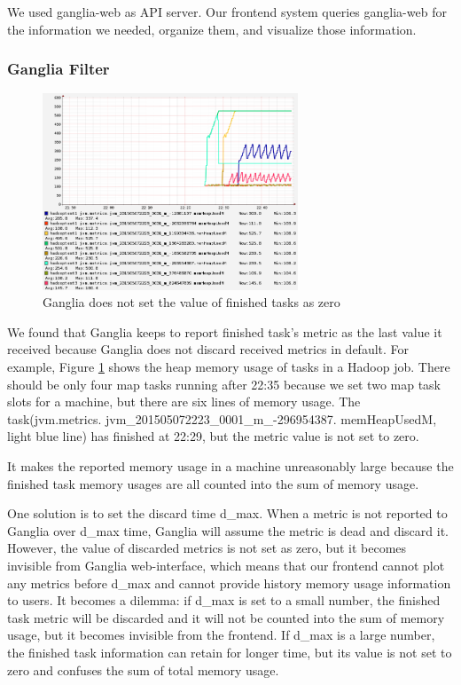 We used ganglia-web as API server. Our frontend system queries ganglia-web for the information we needed, organize them, and visualize those information. 

\subsubsection{Ganglia Filter}

\begin{figure}[ht]
  \centering
    \includegraphics[width=3.0in]{image/ganglia_finished_tasks.png}
    \caption{Ganglia does not set the value of finished tasks as zero}
    \label{ref:gangliah_bug}
\end{figure}

We found that Ganglia keeps to report finished task's metric as the last value it received because Ganglia does not discard received metrics in default. For example, Figure \ref{ref:gangliah_bug} shows the heap memory usage of tasks in a Hadoop job. There should be only four map tasks running after 22:35 because we set two map task slots for a machine, but there are six lines of memory usage. The task(jvm.metrics. jvm\_201505072223\_0001\_m\_-296954387. memHeapUsedM, light blue line) has finished at 22:29, but the metric value is not set to zero.

It makes the reported memory usage in a machine unreasonably large because the finished task memory usages are all counted into the sum of memory usage.

One solution is to set the discard time d\_max. When a metric is not reported to Ganglia over d\_max time, Ganglia will assume the metric is dead and discard it. However, the value of discarded metrics is not set as zero, but it becomes invisible from Ganglia web-interface, which means that our frontend cannot plot any metrics before d\_max and cannot provide history memory usage information to users. It becomes a dilemma: if d\_max is set to a small number, the finished task metric will be discarded and it will not be counted into the sum of memory usage, but it becomes invisible from the frontend. If d\_max is a large number, the finished task information can retain for longer time, but its value is not set to zero and confuses the sum of total memory usage.

